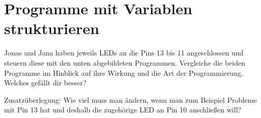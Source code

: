 \section{Programme mit Variablen strukturieren}
\vspace{-0.5\baselineskip}
\begin{aufgabe}
	Jonas und Jana haben jeweils LEDs an die Pins 13 bis 11 angeschlossen und steuern diese mit den unten abgebildeten Programmen. Vergleiche die beiden Programme im Hinblick auf ihre Wirkung und die Art der Programmierung. Welches gefällt dir besser?
	
	Zusatzüberlegung: Wie viel muss man ändern, wenn man zum Beispiel Probleme mit Pin 13 hat und deshalb die zugehörige LED an Pin 10 anschließen will?
\end{aufgabe}

